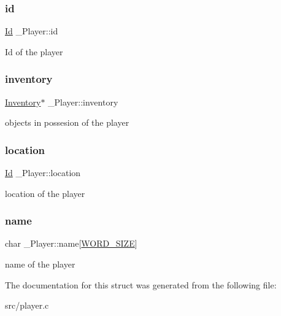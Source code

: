\subsubsection{\texorpdfstring{id}{id}}
{\footnotesize\ttfamily \hyperlink{types_8h_a845e604fb28f7e3d97549da3448149d3}{Id} \+\_\+\+Player\+::id}

Id of the player \mbox{\label{struct__Player_a5e02924cb82ca61f74ba414d190aa29b}} 
\subsubsection{\texorpdfstring{inventory}{inventory}}
{\footnotesize\ttfamily \hyperlink{inventory_8h_a2253bf64ac4ce6a9c1d6f39c0b0d32a3}{Inventory}$\ast$ \+\_\+\+Player\+::inventory}

objects in possesion of the player \mbox{\label{struct__Player_adbb6195d15b88f3f658e74274eff52d8}} 
\subsubsection{\texorpdfstring{location}{location}}
{\footnotesize\ttfamily \hyperlink{types_8h_a845e604fb28f7e3d97549da3448149d3}{Id} \+\_\+\+Player\+::location}

location of the player \mbox{\label{struct__Player_adda99df91c28eb58d392f2b43fc6898f}} 
\subsubsection{\texorpdfstring{name}{name}}
{\footnotesize\ttfamily char \+\_\+\+Player\+::name\mbox{[}\hyperlink{types_8h_a92ed8507d1cd2331ad09275c5c4c1c89}{W\+O\+R\+D\+\_\+\+S\+I\+ZE}\mbox{]}}

name of the player 

The documentation for this struct was generated from the following file\+:\begin{DoxyCompactItemize}
\item 
src/player.\+c\end{DoxyCompactItemize}
